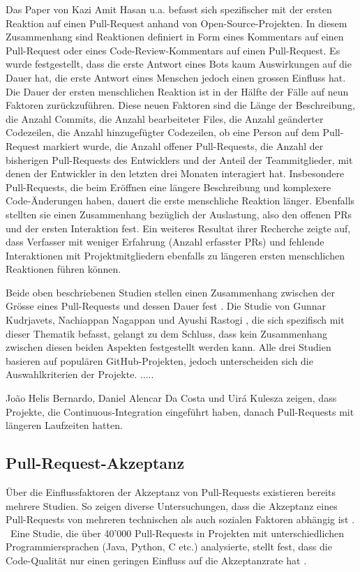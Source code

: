 Das Paper von Kazi Amit Hasan u.a.\parencite{hasan_understanding_2023} befasst sich spezifischer mit der ersten Reaktion auf einen Pull-Request anhand von Open-Source-Projekten. In diesem Zusammenhang sind Reaktionen definiert in Form eines Kommentars auf einen Pull-Request oder eines Code-Review-Kommentars auf einen Pull-Request. Es wurde festgestellt, dass die erste Antwort eines Bots kaum Auswirkungen auf die Dauer hat, die erste Antwort eines Menschen jedoch einen grossen Einfluss hat. Die Dauer der ersten menschlichen Reaktion ist in der Hälfte der Fälle auf neun Faktoren zurückzuführen. Diese neuen Faktoren sind die Länge der Beschreibung, die Anzahl Commits, die Anzahl bearbeiteter Files, die Anzahl geänderter Codezeilen, die Anzahl hinzugefügter Codezeilen,  ob eine Person auf dem Pull-Request markiert wurde, die Anzahl offener Pull-Requests, die Anzahl der bisherigen Pull-Requests des Entwicklers und der Anteil der Teammitglieder, mit denen der Entwickler in den letzten drei Monaten interagiert hat. Insbesondere Pull-Requests, die beim Eröffnen eine längere Beschreibung und komplexere Code-Änderungen haben, dauert die erste menschliche Reaktion länger. Ebenfalls stellten sie einen Zusammenhang bezüglich der Auslastung, also den offenen PRs und der ersten Interaktion fest. Ein weiteres Resultat ihrer Recherche zeigte auf, dass Verfasser mit weniger Erfahrung (Anzahl erfasster PRs) und fehlende Interaktionen mit Projektmitgliedern ebenfalls zu längeren ersten menschlichen Reaktionen führen können.\parencite{hasan_understanding_2023} 

Beide oben beschriebenen Studien stellen einen Zusammenhang zwischen der Grösse eines Pull-Requests und dessen Dauer fest \parencite{yu_wait_2015}\parencite{hasan_understanding_2023}. Die Studie von Gunnar Kudrjavets, Nachiappan Nagappan und Ayushi Rastogi  \parencite{kudrjavets_small_2022}, die sich spezifisch mit dieser Thematik befasst, gelangt zu dem Schluss, dass kein Zusammenhang zwischen diesen beiden Aspekten festgestellt werden kann. Alle drei Studien basieren auf populären GitHub-Projekten, jedoch unterscheiden sich die Auswahlkriterien der Projekte. .....

João Helis Bernardo, Daniel Alencar Da Costa und Uirá Kulesza \parencite{bernardo_studying_2018} zeigen, dass Projekte, die Continuous-Integration eingeführt haben, danach Pull-Requests mit längeren Laufzeiten hatten.

\subsection{Pull-Request-Akzeptanz}
Über die Einflussfaktoren der Akzeptanz von Pull-Reque\-sts existieren bereits mehrere Studien.
So zeigen diverse Untersuchungen, dass die Akzeptanz eines Pull-Requests von mehreren technischen als auch sozialen Faktoren abhängig ist \parencite{gousios_exploratory_2014}. \
Eine Studie, die über 40'000 Pull-Requests in Projekten mit unterschiedlichen Programmiersprachen (Java, Python, C etc.) analysierte, stellt fest, dass die Code-Qualität nur einen geringen Einfluss auf die Akzeptanzrate hat \parencite{kuhejda_pull_2023}.

